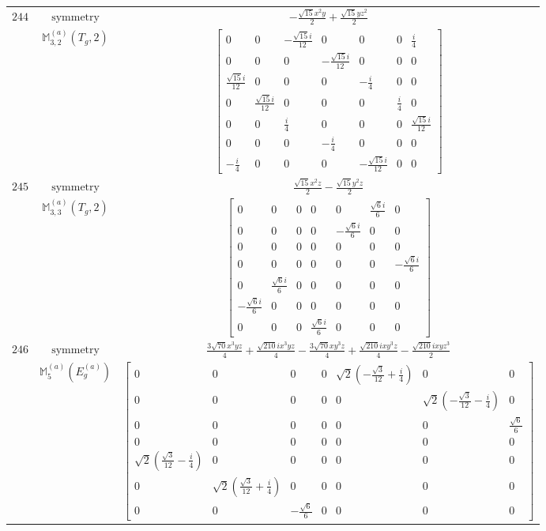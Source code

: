 \documentclass[fleqn,8pt,landscape]{jsarticle}
\begin{document}
\begin{longtable}{ccc}
$ 244 $ & $ \text{symmetry} $ & $ - \frac{\sqrt{15} x^{2} y}{2} + \frac{\sqrt{15} y z^{2}}{2} $ \\
$  $ & $ \mathbb{M}_{3,2}^{(a)}(T_{g},2) $ & $ \begin{bmatrix} 0 & 0 & - \frac{\sqrt{15} i}{12} & 0 & 0 & 0 & \frac{i}{4} \\ 0 & 0 & 0 & - \frac{\sqrt{15} i}{12} & 0 & 0 & 0 \\ \frac{\sqrt{15} i}{12} & 0 & 0 & 0 & - \frac{i}{4} & 0 & 0 \\ 0 & \frac{\sqrt{15} i}{12} & 0 & 0 & 0 & \frac{i}{4} & 0 \\ 0 & 0 & \frac{i}{4} & 0 & 0 & 0 & \frac{\sqrt{15} i}{12} \\ 0 & 0 & 0 & - \frac{i}{4} & 0 & 0 & 0 \\ - \frac{i}{4} & 0 & 0 & 0 & - \frac{\sqrt{15} i}{12} & 0 & 0 \end{bmatrix} $ \\ \hline
$ 245 $ & $ \text{symmetry} $ & $ \frac{\sqrt{15} x^{2} z}{2} - \frac{\sqrt{15} y^{2} z}{2} $ \\
$  $ & $ \mathbb{M}_{3,3}^{(a)}(T_{g},2) $ & $ \begin{bmatrix} 0 & 0 & 0 & 0 & 0 & \frac{\sqrt{6} i}{6} & 0 \\ 0 & 0 & 0 & 0 & - \frac{\sqrt{6} i}{6} & 0 & 0 \\ 0 & 0 & 0 & 0 & 0 & 0 & 0 \\ 0 & 0 & 0 & 0 & 0 & 0 & - \frac{\sqrt{6} i}{6} \\ 0 & \frac{\sqrt{6} i}{6} & 0 & 0 & 0 & 0 & 0 \\ - \frac{\sqrt{6} i}{6} & 0 & 0 & 0 & 0 & 0 & 0 \\ 0 & 0 & 0 & \frac{\sqrt{6} i}{6} & 0 & 0 & 0 \end{bmatrix} $ \\ \hline
$ 246 $ & $ \text{symmetry} $ & $ \frac{3 \sqrt{70} x^{3} y z}{4} + \frac{\sqrt{210} i x^{3} y z}{4} - \frac{3 \sqrt{70} x y^{3} z}{4} + \frac{\sqrt{210} i x y^{3} z}{4} - \frac{\sqrt{210} i x y z^{3}}{2} $ \\
$  $ & $ \mathbb{M}_{5}^{(a)}(E_{g}^{(a)}) $ & $ \begin{bmatrix} 0 & 0 & 0 & 0 & \sqrt{2} \left(- \frac{\sqrt{3}}{12} + \frac{i}{4}\right) & 0 & 0 \\ 0 & 0 & 0 & 0 & 0 & \sqrt{2} \left(- \frac{\sqrt{3}}{12} - \frac{i}{4}\right) & 0 \\ 0 & 0 & 0 & 0 & 0 & 0 & \frac{\sqrt{6}}{6} \\ 0 & 0 & 0 & 0 & 0 & 0 & 0 \\ \sqrt{2} \left(\frac{\sqrt{3}}{12} - \frac{i}{4}\right) & 0 & 0 & 0 & 0 & 0 & 0 \\ 0 & \sqrt{2} \left(\frac{\sqrt{3}}{12} + \frac{i}{4}\right) & 0 & 0 & 0 & 0 & 0 \\ 0 & 0 & - \frac{\sqrt{6}}{6} & 0 & 0 & 0 & 0 \end{bmatrix} $ \\ \hline

\end{longtable}
\end{document}
